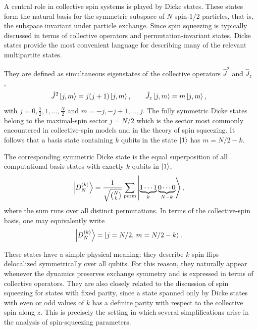 A central role in collective spin systems is played by Dicke states. These states form the natural basis for the symmetric subspace of \(N\) spin-1/2 particles, that is, the subspace invariant under particle exchange. Since spin squeezing is typically discussed in terms of collective operators and permutation-invariant states, Dicke states provide the most convenient language for describing many of the relevant multipartite states.

They are defined as simultaneous eigenstates of the collective operators \(\hat J^2\) and \(\hat J_z\),
\begin{equation}
	\hat J^2 \ket{j,m} = j(j+1)\ket{j,m},
	\qquad
	\hat J_z \ket{j,m} = m \ket{j,m},
	\label{eq:dicke_eigenvalue_equations}
\end{equation}
with \(j=0,\frac{1}{2},1,\dots,\frac{N}{2}\) and \(m=-j,-j+1,\dots,j\). The fully symmetric Dicke states belong to the maximal-spin sector $j=N/2$ which is the sector most commonly encountered in collective-spin models and in the theory of spin squeezing.
It follows that a basis state containing \(k\) qubits in the state \(\ket{1}\) has $m=N/2-k$.

The corresponding symmetric Dicke state is the equal superposition of all computational basis states with exactly \(k\) qubits in \(\ket{1}\),
\begin{equation}
	\ket{D_N^{(k)}}
	=
	\frac{1}{\sqrt{\binom{N}{k}}}
	\sum_{\mathrm{perm}}
	\ket{\underbrace{1\cdots1}_{k}\underbrace{0\cdots0}_{N-k}},
	\label{eq:dicke_state_definition}
\end{equation}
where the sum runs over all distinct permutations. In terms of the collective-spin basis, one may equivalently write
\begin{equation}
	\ket{D_N^{(k)}}=\ket{j=N/2,\,m=N/2-k}.
	\label{eq:dicke_collective_notation}
\end{equation}

These states have a simple physical meaning: they describe \(k\) spin flips delocalized symmetrically over all qubits. For this reason, they naturally appear whenever the dynamics preserves exchange symmetry and is expressed in terms of collective operators. They are also closely related to the discussion of spin squeezing for states with fixed parity, since a state spanned only by Dicke states with even or odd values of \(k\) has a definite parity with respect to the collective spin along \(z\). This is precisely the setting in which several simplifications arise in the analysis of spin-squeezing parameters.

